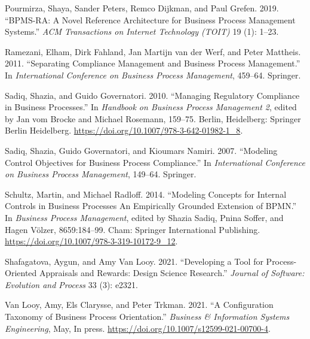\documentclass[
  letterpaper,
  DIV=11,
  numbers=noendperiod]{scrreprt}
\newlength{\cslhangindent}
\newlength{\cslentryspacingunit} %
\newenvironment{CSLReferences}[2] %
 {%
  \setlength{\parindent}{0pt}
  \ifodd #1
  \let\oldpar\par
  \def\par{\hangindent=\cslhangindent\oldpar}
  \fi
  \setlength{\parskip}{#2\cslentryspacingunit}
 }%
 {}
\begin{document}
\begin{CSLReferences}{1}{0}
\leavevmode{}%
Pourmirza, Shaya, Sander Peters, Remco Dijkman, and Paul Grefen. 2019.
{``{BPMS-RA}: A Novel Reference Architecture for Business Process
Management Systems.''} \emph{ACM Transactions on Internet Technology
(TOIT)} 19 (1): 1--23.

\leavevmode{}%
Ramezani, Elham, Dirk Fahland, Jan Martijn van der Werf, and Peter
Mattheis. 2011. {``Separating Compliance Management and Business Process
Management.''} In \emph{International {Conference} on {Business Process
Management}}, 459--64. {Springer}.

\leavevmode{}%
Sadiq, Shazia, and Guido Governatori. 2010. {``Managing {Regulatory
Compliance} in {Business Processes}.''} In \emph{Handbook on {Business
Process Management} 2}, edited by Jan vom Brocke and Michael Rosemann,
159--75. {Berlin, Heidelberg}: {Springer Berlin Heidelberg}.
\url{https://doi.org/10.1007/978-3-642-01982-1_8}.

\leavevmode{}%
Sadiq, Shazia, Guido Governatori, and Kioumars Namiri. 2007. {``Modeling
Control Objectives for Business Process Compliance.''} In
\emph{International Conference on Business Process Management}, 149--64.
{Springer}.

\leavevmode{}%
Schultz, Martin, and Michael Radloff. 2014. {``Modeling {Concepts} for
{Internal Controls} in {Business Processes} \textendash{} {An
Empirically Grounded Extension} of {BPMN}.''} In \emph{Business {Process
Management}}, edited by Shazia Sadiq, Pnina Soffer, and Hagen Völzer,
8659:184--99. {Cham}: {Springer International Publishing}.
\url{https://doi.org/10.1007/978-3-319-10172-9_12}.

\leavevmode{}%
Shafagatova, Aygun, and Amy Van Looy. 2021. {``Developing a Tool for
Process-Oriented Appraisals and Rewards: {Design} Science Research.''}
\emph{Journal of Software: Evolution and Process} 33 (3): e2321.

\leavevmode{}%
Van Looy, Amy, Els Clarysse, and Peter Trkman. 2021. {``A {Configuration
Taxonomy} of {Business Process Orientation}.''} \emph{Business \&
Information Systems Engineering}, May, In press.
\url{https://doi.org/10.1007/s12599-021-00700-4}.


\end{CSLReferences}
\end{document}
